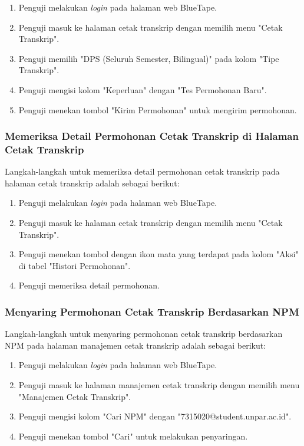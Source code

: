 \begin{enumerate}
    \item Penguji melakukan \textit{login} pada halaman web BlueTape.
    \item Penguji masuk ke halaman cetak transkrip dengan memilih menu "Cetak Transkrip".
    \item Penguji memilih "DPS (Seluruh Semester, Bilingual)" pada kolom "Tipe Transkrip".
    \item Penguji mengisi kolom "Keperluan" dengan "Tes Permohonan Baru".
    \item Penguji menekan tombol "Kirim Permohonan" untuk mengirim permohonan.
\end{enumerate}

\subsubsection{Memeriksa Detail Permohonan Cetak Transkrip di Halaman Cetak Transkrip}
\label{subsubsec:skenario_memeriksa_detail_permohonan_cetak_transkrip_di_halaman_cetak_transkrip}
Langkah-langkah untuk memeriksa detail permohonan cetak transkrip pada halaman cetak transkrip adalah sebagai berikut:

\begin{enumerate}
    \item Penguji melakukan \textit{login} pada halaman web BlueTape.
    \item Penguji masuk ke halaman cetak transkrip dengan memilih menu "Cetak Transkrip".
    \item Penguji menekan tombol dengan ikon mata yang terdapat pada kolom "Aksi" di tabel "Histori Permohonan".
    \item Penguji memeriksa detail permohonan.
\end{enumerate}

\subsubsection{Menyaring Permohonan Cetak Transkrip Berdasarkan NPM}
\label{subsubsec:skenario_menyaring_permohonan_cetak_transkrip_berdasarkan_npm}
Langkah-langkah untuk menyaring permohonan cetak transkrip berdasarkan NPM pada halaman manajemen cetak transkrip adalah sebagai berikut:

\begin{enumerate}
    \item Penguji melakukan \textit{login} pada halaman web BlueTape.
    \item Penguji masuk ke halaman manajemen cetak transkrip dengan memilih menu "Manajemen Cetak Transkrip".
    \item Penguji mengisi kolom "Cari NPM" dengan "7315020@student.unpar.ac.id".
    \item Penguji menekan tombol "Cari" untuk melakukan penyaringan.
\end{enumerate}

